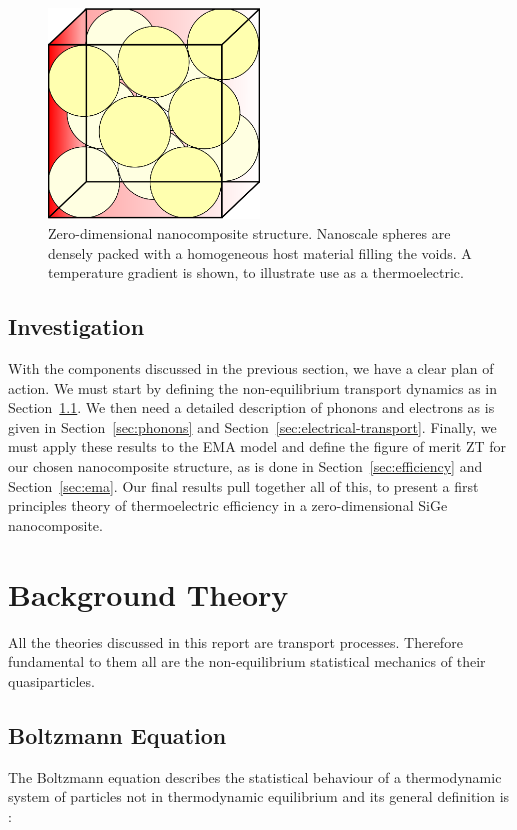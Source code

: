 \documentclass[12pt]{article}
\newcommand{\secref}[2][Section~]{#1\ref{#2}}
\begin{document}
\begin{figure}
	\centering
	\includegraphics[width=0.5\textwidth]{nanospheres-cube.eps}
	\caption{Zero-dimensional nanocomposite structure. Nanoscale spheres are densely packed with a homogeneous host material filling the voids. A temperature gradient is shown, to illustrate use as a thermoelectric.}
	\label{fig:nanospheres-cube}
\end{figure}

\subsection{Investigation}
With the components discussed in the previous section, we have a clear plan of action. We must start by defining the non-equilibrium transport dynamics as in \secref{sec:boltz}. We then need a detailed description of phonons and electrons as is given in \secref{sec:phonons} and \secref{sec:electrical-transport}. Finally, we must apply these results to the EMA model and define the figure of merit ZT for our chosen nanocomposite structure, as is done in \secref{sec:efficiency} and \secref{sec:ema}. Our final results pull together all of this, to present a first principles theory of thermoelectric efficiency in a zero-dimensional SiGe nanocomposite.

\section{Background Theory}
\label{sec:background}
All the theories discussed in this report are transport processes. Therefore fundamental to them all are the non-equilibrium statistical mechanics of their quasiparticles.

\subsection{Boltzmann Equation}
\label{sec:boltz}
The Boltzmann equation describes the statistical behaviour of a thermodynamic system of particles not in thermodynamic equilibrium and its general definition is \cite{kittel}:
\end{document}
